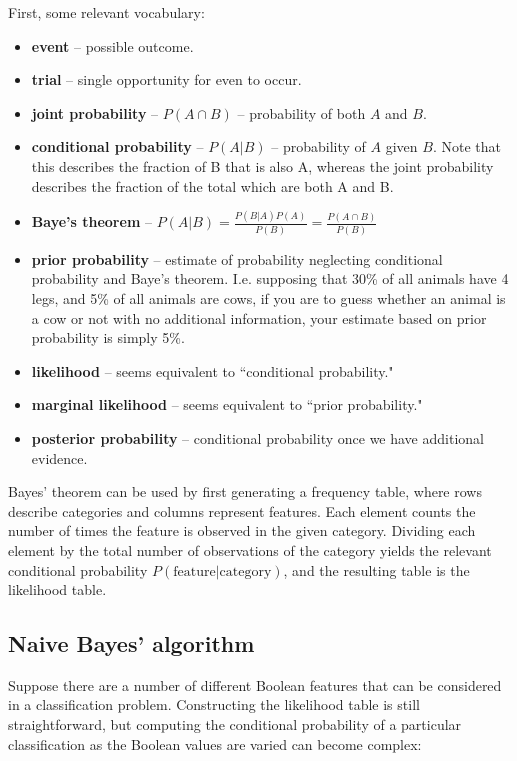 \documentclass[]{article}
\begin{document}
First, some relevant vocabulary:
\begin{itemize}
\item \textbf{event} -- possible outcome.
\item \textbf{trial} -- single opportunity for even to occur.
\item \textbf{joint probability} -- $P(A \cap B)$ -- probability of both $A$ and $B$.
\item \textbf{conditional probability} -- $P(A|B)$ -- probability of $A$ given $B$.  Note that this describes the fraction of B that is also A, whereas the joint probability describes the fraction of the total which are both A and B.
\item \textbf{Baye's theorem} -- $P(A|B) = \frac{P(B|A)P(A)}{P(B)} = \frac{P(A \cap B)}{P(B)}$
\item \textbf{prior probability} -- estimate of probability neglecting conditional probability and Baye's theorem.  I.e. supposing that 30\% of all animals have 4 legs, and 5\% of all animals are cows, if you are to guess whether an animal is a cow or not with no additional information, your estimate based on prior probability is simply 5\%.
\item \textbf{likelihood} -- seems equivalent to ``conditional probability."
\item \textbf{marginal likelihood} -- seems equivalent to ``prior probability."
\item \textbf{posterior probability} -- conditional probability once we have additional evidence.
\end{itemize}

Bayes' theorem can be used by first generating a frequency table, where rows describe categories and columns represent features.  Each element counts the number of times the feature is observed in the given category.  Dividing each element by the total number of observations of the category yields the relevant conditional probability $P(\text{feature}|\text{category})$, and the resulting table is the likelihood table.

\subsection{Naive Bayes' algorithm}

Suppose there are a number of different Boolean features that can be considered in a classification problem.  Constructing the likelihood table is still straightforward, but computing the conditional probability of a particular classification as the Boolean values are varied can become complex:
\end{document}

